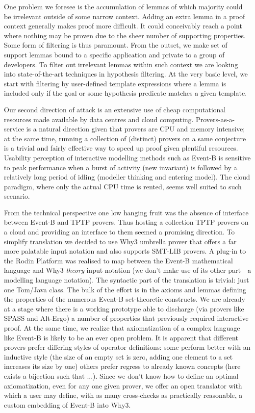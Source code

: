 \documentclass{llncs}
\begin{document}
One problem we foresee is the accumulation of lemmas of which majority could be irrelevant outside of some narrow context. Adding an extra lemma in a proof context generally makes proof more difficult. It could conceivably reach a point where nothing may be proven due to the sheer number of supporting properties. Some form of filtering is thus paramount. From the outset, we make set of support lemmas bound to a specific application and private to a group of developers. To filter out irrelevant lemmas within such context we are looking into state-of-the-art techniques in hypothesis filtering. At the very basic level, we start with filtering by user-defined template expressions where a lemma is included only if the goal or some hypothesis predicate matches a given template. 

Our second direction of attack is an extensive use of cheap computational resources made available by data centres and cloud computing. Provers-as-a-service is a natural direction given that provers are CPU and memory intensive; at the same time, running a collection of (distinct) provers on a same conjecture is a trivial and fairly effective way to speed up proof given plentiful resources. Usability perception of interactive modelling methods such as Event-B is sensitive to peak performance when a burst of activity (new invariant) is followed by a relatively long period of idling (modeller thinking and entering model). The cloud paradigm, where only the actual CPU time is rented, seems well suited to such scenario. 

From the technical perspective one low hanging fruit was the absence of interface between Event-B and TPTP provers. Thus hosting a collection TPTP provers on a cloud and providing an interface to them seemed a promising direction. To simplify translation we decided to use Why3 \cite{boogie11why3} umbrella prover that offers a far more palatable input notation and also supports SMT-LIB provers. A plug-in to the Rodin Platform was realised to map between the Event-B mathematical language and Why3 \emph{theory} input notation (we don't make use of its other part - a modelling language notation). The syntactic part of the translation is trivial: just one Tom/Java class. The bulk of the effort is in the axioms and lemmas defining the properties of the numerous Event-B set-theoretic constructs. We are already at a stage where there is a working prototype able to discharge (via provers like SPASS and Alt-Ergo) a number of properties that previously required interactive proof. At the same time, we realize that axiomatization of a complex language like Event-B is likely to be an ever open problem. It is apparent that different provers prefer differing styles of operator definitions: some perform better with an inductive style (the size of an empty set is zero, adding one element to a set increases its size by one) others prefer regress to already known concepts (here exists a bijection such that ...). Since we don't know how to define an optimal axiomatization, even for any one given prover, we offer an open translator with which a user may define, with as many cross-checks as practically reasonable, a custom embedding of Event-B into Why3.
\end{document}
